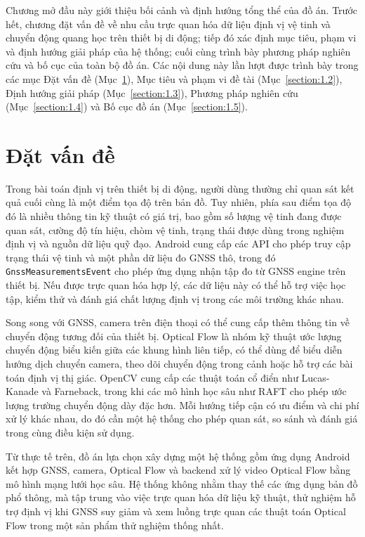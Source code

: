 \documentclass[../DoAn.tex]{subfiles}
\begin{document}
Chương mở đầu này giới thiệu bối cảnh và định hướng tổng thể của đồ án. Trước hết, chương đặt vấn đề về nhu cầu trực quan hóa dữ liệu định vị vệ tinh và chuyển động quang học trên thiết bị di động; tiếp đó xác định mục tiêu, phạm vi và định hướng giải pháp của hệ thống; cuối cùng trình bày phương pháp nghiên cứu và bố cục của toàn bộ đồ án. Các nội dung này lần lượt được trình bày trong các mục Đặt vấn đề (Mục~\ref{section:1.1}), Mục tiêu và phạm vi đề tài (Mục~\ref{section:1.2}), Định hướng giải pháp (Mục~\ref{section:1.3}), Phương pháp nghiên cứu (Mục~\ref{section:1.4}) và Bố cục đồ án (Mục~\ref{section:1.5}).

\section{Đặt vấn đề}
\label{section:1.1}
Trong bài toán định vị trên thiết bị di động, người dùng thường chỉ quan sát kết quả cuối cùng là một điểm tọa độ trên bản đồ. Tuy nhiên, phía sau điểm tọa độ đó là nhiều thông tin kỹ thuật có giá trị, bao gồm số lượng vệ tinh đang được quan sát, cường độ tín hiệu, chòm vệ tinh, trạng thái được dùng trong nghiệm định vị và nguồn dữ liệu quỹ đạo. Android cung cấp các API cho phép truy cập trạng thái vệ tinh và một phần dữ liệu đo GNSS thô, trong đó \texttt{GnssMeasurementsEvent} cho phép ứng dụng nhận tập đo từ GNSS engine trên thiết bị. Nếu được trực quan hóa hợp lý, các dữ liệu này có thể hỗ trợ việc học tập, kiểm thử và đánh giá chất lượng định vị trong các môi trường khác nhau.

Song song với GNSS, camera trên điện thoại có thể cung cấp thêm thông tin về chuyển động tương đối của thiết bị. Optical Flow là nhóm kỹ thuật ước lượng chuyển động biểu kiến giữa các khung hình liên tiếp, có thể dùng để biểu diễn hướng dịch chuyển camera, theo dõi chuyển động trong cảnh hoặc hỗ trợ các bài toán định vị thị giác. OpenCV cung cấp các thuật toán cổ điển như Lucas-Kanade và Farneback, trong khi các mô hình học sâu như RAFT cho phép ước lượng trường chuyển động dày đặc hơn. Mỗi hướng tiếp cận có ưu điểm và chi phí xử lý khác nhau, do đó cần một hệ thống cho phép quan sát, so sánh và đánh giá trong cùng điều kiện sử dụng.

Từ thực tế trên, đồ án lựa chọn xây dựng một hệ thống gồm ứng dụng Android  kết hợp GNSS, camera, Optical Flow và backend xử lý video Optical Flow bằng mô hình mạng lưới học sâu. Hệ thống không nhằm thay thế các ứng dụng bản đồ phổ thông, mà tập trung vào việc trực quan hóa dữ liệu kỹ thuật, thử nghiệm hỗ trợ định vị khi GNSS suy giảm và xem luồng trực quan các thuật toán Optical Flow trong một sản phẩm thử nghiệm thống nhất.
\end{document}
